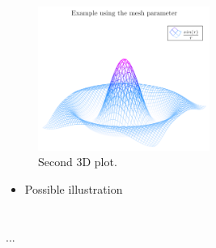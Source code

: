     \begin{figure}[h]
    \centering
    \includegraphics[width=0.5\textwidth]{Imagenes/pgfplots3dexample.png}
    \caption{Second 3D plot.}
    \label{fig:figure1}
    \end{figure}

    \begin{illustration}
        \caption{This is an example caption.}
        \label{ill:blah}  
        \begin{itemize}
          \item Possible illustration
        \end{itemize}
      \end{illustration}
\section*{\ProximoCapitulo}
\TocProximoCapitulo

...

